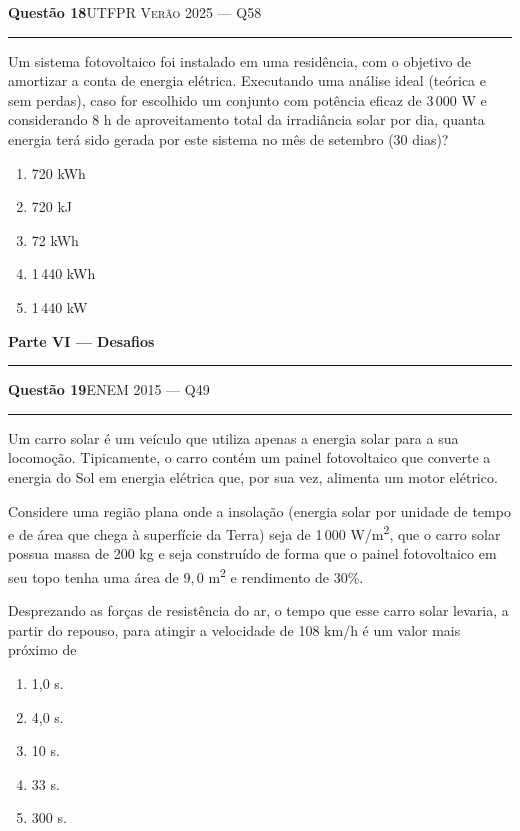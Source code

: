 \documentclass[11pt,a4paper]{article}
\newcommand{\fonte}[1]{{\small\scshape\color{grafite}#1}}
\newenvironment{questao}[2]{%
  \needspace{6\baselineskip}
  \par\addvspace{1.6em}
  {\large\bfseries\color{vinho}Quest\~ao #1}\hfill #2\\[-0.55em]
  {\color{black!25}\rule{\linewidth}{0.4pt}}
  \par\nobreak\smallskip
}{\par\addvspace{0.4em}}
\newcommand{\parte}[1]{%
  \needspace{7\baselineskip}
  \vspace{1.8em}
  {\Large\bfseries #1}\\[-0.55em]
  {\color{black!30}\rule{\linewidth}{0.5pt}}
  \par\nobreak\smallskip
}
\begin{document}
\begin{questao}{18}{\fonte{UTFPR Ver\~ao 2025 --- Q58}}
Um sistema fotovoltaico foi instalado em uma resid\^encia, com o
objetivo de amortizar a conta de energia el\'etrica. Executando uma
an\'alise ideal (te\'orica e sem perdas), caso for escolhido um
conjunto com pot\^encia eficaz de 3\,000 W e considerando 8 h de
aproveitamento total da irradi\^ancia solar por dia, quanta energia
ter\'a sido gerada por este sistema no m\^es de setembro (30 dias)?
\begin{enumerate}
  \item 720 kWh
  \item 720 kJ
  \item 72 kWh
  \item 1\,440 kWh
  \item 1\,440 kW
\end{enumerate}
\end{questao}

\parte{Parte VI --- Desafios}

\begin{questao}{19}{\fonte{ENEM 2015 --- Q49}}
Um carro solar \'e um ve\'iculo que utiliza apenas a energia solar
para a sua locomo\c{c}\~ao. Tipicamente, o carro cont\'em um painel
fotovoltaico que converte a energia do Sol em energia el\'etrica que,
por sua vez, alimenta um motor el\'etrico.

Considere uma regi\~ao plana onde a insola\c{c}\~ao (energia solar por
unidade de tempo e de \'area que chega \`a superf\'icie da Terra) seja
de 1\,000 W/m\textsuperscript{2}, que o carro solar possua massa de
200 kg e seja constru\'ido de forma que o painel fotovoltaico em seu
topo tenha uma \'area de $9{,}0$ m\textsuperscript{2} e rendimento de
30\%.

Desprezando as for\c{c}as de resist\^encia do ar, o tempo que esse
carro solar levaria, a partir do repouso, para atingir a velocidade de
108 km/h \'e um valor mais pr\'oximo de
\begin{enumerate}
  \item 1,0 s.
  \item 4,0 s.
  \item 10 s.
  \item 33 s.
  \item 300 s.
\end{enumerate}
\end{questao}
\end{document}
